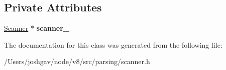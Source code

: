 \subsection*{Private Attributes}
\begin{DoxyCompactItemize}
\item 
\hyperlink{classv8_1_1internal_1_1_scanner}{Scanner} $\ast$ {\bfseries scanner\+\_\+}\hypertarget{classv8_1_1internal_1_1_scanner_1_1_bookmark_scope_a169c561c4154b3d5d2df576e99937812}{}\label{classv8_1_1internal_1_1_scanner_1_1_bookmark_scope_a169c561c4154b3d5d2df576e99937812}

\end{DoxyCompactItemize}


The documentation for this class was generated from the following file\+:\begin{DoxyCompactItemize}
\item 
/\+Users/joshgav/node/v8/src/parsing/scanner.\+h\end{DoxyCompactItemize}
